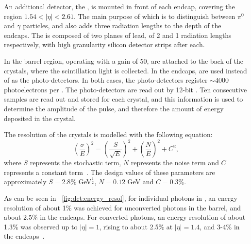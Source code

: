 An additional detector, the \ES, is mounted in front of each endcap, covering the region $1.54 <|\eta| < 2.61$. The main purpose of which is to distinguish between $\pi^0$ and $\gamma$ particles, and also adds three radiation lengths to the depth of the \ECAL endcaps. The \ES is composed of two planes of lead, of 2 and 1 radiation lengths respectively, with high granularity silicon detector strips after each. %

In the barrel region, \APDs operating with a gain of 50, are attached to the back of the crystals, where the scintillation light is collected. In the endcaps, \VPTs are used instead of \APDs as the photo-detectors. In both cases, the photo-detectors register $\sim 4000 $ photoelectrons per \GeV. The photo-detectors are read out by 12-bit \ADC. Ten consecutive samples are read out and stored for each crystal, and this information is used to determine the amplitude of the pulse, and therefore the amount of energy deposited in the crystal.

The resolution of the \ECAL crystals is modelled with the following equation:
\begin{equation} 
\left( \frac{\sigma}{E}\right) ^2= \left( \frac{S}{\sqrt{E}} \right)^2 + \left( \frac{N}{E} \right)^2 + C^2,
\end{equation}
where $S$ represents the stochastic term, $N$ represents the noise term and $C$ represents a constant term~\cite{CMSTDR}. The design values of these parameters are approximately $S=2.8\%$ GeV$^\frac{1}{2}$, $ N= 0.12$ GeV and $C=0.3 \%$. 

As can be seen in \Fig~\ref{fig:det:energy_resol}, for individual \Hgg photons in \RunI, an energy resolution of about 1\% was achieved for unconverted photons in the barrel, and about 2.5\% in the endcaps. For converted photons, an energy resolution of about 1.3\% was observed up to $|\eta| = 1$, rising to about 2.5\% at $|\eta| = 1.4$, and 3-4\% in the endcaps~\cite{CMS-PAS-EGM-14-001}.

